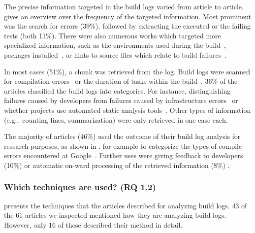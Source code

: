 The precise information targeted in the build logs varied from article
to article.
 gives an overview over the frequency of
the targeted information.
Most prominent was the search for errors (39\%), followed by extracting
the executed or the failing
tests (both 11\%).
There were also numerous works which targeted more specialized
information, such as the environments used during the
build~\cite{zolfagharinia2017not}, packages
installed~\cite{selberg2012use}, or hints to source files which
relate to build failures~\cite{ren2018automated}.

In most cases (51\%), a chunk was retrieved from the log.
Build logs were scanned for compilation
errors~\cite{clemencic2014new} or
the duration of tasks within the build~\cite{zhang2016android}.
36\% of the articles classified the build logs into categories.
For instance, distinguishing failures caused by developers from
failures caused
by infrastructure errors~\cite{lindqvist2019detection} or
whether projects use automated static analysis
tools~\cite{kavaler2019tool}.
Other types of information (e.g.,\ counting
lines, summarization) were only retrieved
in one case each.

The majority of articles (46\%) used the outcome of their build log
analysis for research purposes, as shown in .
for example to categorize the types of compile errors encountered at
Google~\cite{seo2014programmers}.
Further uses were giving feedback to developers (10\%) or automatic
on-ward processing of the retrieved information (8\%)
.

\subsubsection{Which techniques are used? (RQ 1.2)}
 presents the techniques that the articles
described for analyzing build logs.
43 of the 61 articles we inspected mentioned how they are analyzing
build logs.
However, only 16 of these described their method in detail.

